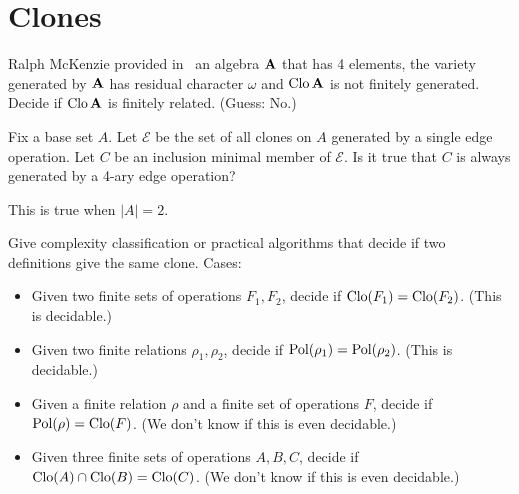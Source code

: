 \section{Clones}
\begin{question} Ralph McKenzie provided
  in~\cite{mckenzie-residual-bounds} an algebra
  ${\mathbf{A}}$ that has 4 elements, the variety generated by ${\mathbf{A}}$ has residual
  character $\omega$ and $\operatorname{Clo} {\mathbf{A}}$ is not finitely generated. Decide if
  $\operatorname{Clo} {\mathbf{A}}$ is finitely related. (Guess: No.)
\end{question}

\begin{question} Fix a base set $A$. Let $\mathcal E$ 
  be the set of all clones on $A$ generated by a single edge operation. Let $C$
  be an inclusion minimal member of $\mathcal E$. Is it true that $C$ is always
  generated by a 4-ary edge operation?
\end{question}
\begin{context}
  This is true when $|A|=2$.
\end{context}

\begin{question}
  Give complexity classification or practical algorithms that decide if two definitions give the same clone. Cases:
  \begin{itemize}
    \item Given two finite sets of operations $F_1, F_2$, decide if
      $\operatorname{Clo}(F_1)=\operatorname{Clo}(F_2)$. (This is decidable.)
    \item Given two finite relations $\rho_1, \rho_2$, decide if
      $\operatorname{Pol}(\rho_1)=\operatorname{Pol}(\rho_2)$. (This is decidable.)
    \item Given a finite relation $\rho$ and a finite set of operations $F$,
      decide if $\operatorname{Pol}(\rho)=\operatorname{Clo}(F)$. (We don't know if this is even
      decidable.)
    \item Given three finite sets of operations $A, B, C$, decide if 
      $\operatorname{Clo}(A)\cap \operatorname{Clo}(B)=\operatorname{Clo}(C)$. (We don't know if this is even
      decidable.)
  \end{itemize}
\end{question}

